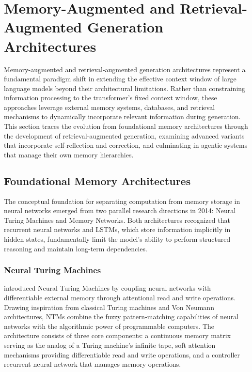 \section{Memory-Augmented and Retrieval-Augmented Generation Architectures}
\label{sec:memoryaugmented}

Memory-augmented and retrieval-augmented generation architectures represent a fundamental paradigm shift in extending the effective context window of large language models beyond their architectural limitations. Rather than constraining information processing to the transformer's fixed context window, these approaches leverage external memory systems, databases, and retrieval mechanisms to dynamically incorporate relevant information during generation. This section traces the evolution from foundational memory architectures through the development of retrieval-augmented generation, examining advanced variants that incorporate self-reflection and correction, and culminating in agentic systems that manage their own memory hierarchies.

\subsection{Foundational Memory Architectures}

The conceptual foundation for separating computation from memory storage in neural networks emerged from two parallel research directions in 2014: Neural Turing Machines and Memory Networks. Both architectures recognized that recurrent neural networks and LSTMs, which store information implicitly in hidden states, fundamentally limit the model's ability to perform structured reasoning and maintain long-term dependencies.

\subsubsection{Neural Turing Machines}

\citet{graves2014neural} introduced Neural Turing Machines by coupling neural networks with differentiable external memory through attentional read and write operations. Drawing inspiration from classical Turing machines and Von Neumann architectures, NTMs combine the fuzzy pattern-matching capabilities of neural networks with the algorithmic power of programmable computers. The architecture consists of three core components: a continuous memory matrix serving as the analog of a Turing machine's infinite tape, soft attention mechanisms providing differentiable read and write operations, and a controller recurrent neural network that manages memory operations.

